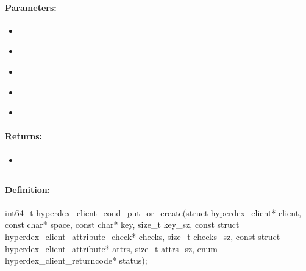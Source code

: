 \paragraph{Parameters:}
\begin{itemize}[noitemsep]
\item {}\\

\item {}\\

\item {}\\

\item {}\\

\item {}\\

\end{itemize}

\paragraph{Returns:}
\begin{itemize}[noitemsep]
\item {}\\

\end{itemize}

\pagebreak
\subsection{}
\label{api:c:cond_put_or_create}


\paragraph{Definition:}
\begin{ccode}
int64_t hyperdex_client_cond_put_or_create(struct hyperdex_client* client,
        const char* space,
        const char* key, size_t key_sz,
        const struct hyperdex_client_attribute_check* checks, size_t checks_sz,
        const struct hyperdex_client_attribute* attrs, size_t attrs_sz,
        enum hyperdex_client_returncode* status);
\end{ccode}

